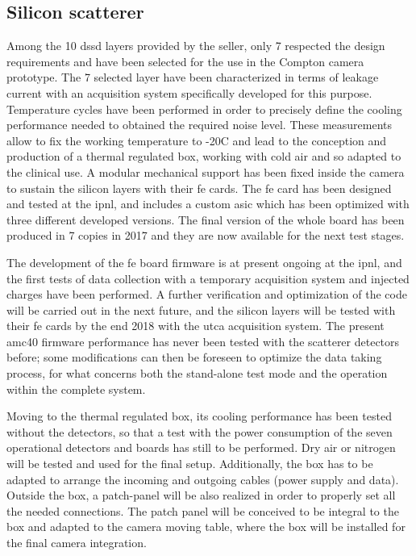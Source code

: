 \subsection{Silicon scatterer}\label{chap3::subsec::scattNext}
Among the 10 \gls{dssd} layers provided by the seller, only 7 respected the design requirements and have been selected for the use in the Compton camera prototype. The 7 selected layer have been characterized in terms of leakage current with an acquisition system specifically developed for this purpose. Temperature cycles have been performed in order to precisely define the cooling performance needed to obtained the required noise level. These measurements allow to fix the working temperature to -20\textdegree{}C and lead to the conception and production of a thermal regulated box, working with cold air and so adapted to the clinical use. A modular mechanical support has been fixed inside the camera to sustain the silicon layers with their \gls{fe} cards. The \gls{fe} card has been designed and tested at the \gls{ipnl}, and includes a custom \gls{asic} which has been optimized with three different developed versions. The final version of the whole board has been produced in 7 copies in 2017 and they are now available for the next test stages.

The development of the \gls{fe} board firmware is at present ongoing at the \gls{ipnl}, and the first tests of data collection with a temporary acquisition system and injected charges have been performed. A further verification and optimization of the code will be carried out in the next future, and the silicon layers will be tested with their \gls{fe} cards by the end 2018 with the \gls{utca} acquisition system. The present \gls{amc}40 firmware performance has never been tested with the scatterer detectors before; some modifications can then be foreseen to optimize the data taking process, for what concerns both the stand-alone test mode and the operation within the complete system.

Moving to the thermal regulated box, its cooling performance has been tested without the detectors, so that a test with the power consumption of the seven operational detectors and boards has still to be performed. Dry air or nitrogen will be tested and used for the final setup. Additionally, the box has to be adapted to arrange the incoming and outgoing cables (power supply and data). Outside the box, a patch-panel will be also realized in order to properly set all the needed connections. The patch panel will be conceived to be integral to the box and adapted to the camera moving table, where the box will be installed for the final camera integration.


